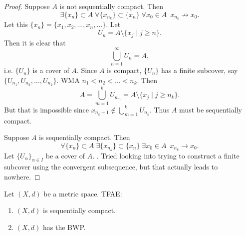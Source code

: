\documentclass[notoc,notitlepage]{tufte-book}
\begin{document}
\begin{proof}
  \hlbnoted{$(\implies)$} Suppose $A$ is not sequentially compact. Then
  \begin{equation*}
    \exists \{ x_n \} \subset A \; \forall \{ x_{n_k} \} \subset \{ x_n \} \; \forall x_0 \in A \enspace x_{n_k} \not\to x_0.
  \end{equation*}
  Let this $\{ x_n \} = \{ x_1, x_2, \ldots, x_n, \ldots \}$. Let
  \begin{equation*}
    U_n = A \setminus \{ x_j \mid j \geq n \}.
  \end{equation*}
  Then it is clear that
  \begin{equation*}
    \bigcup_{n=1}^{\infty} U_n = A,
  \end{equation*}
  i.e. $\{ U_n \}$ is a cover of $A$. Since $A$ is compact, $\{ U_n \}$ has a finite subcover, say $\{ U_{n_1}, U_{n_2}, \ldots, U_{n_k} \}$. WMA $n_1 < n_2 < \hdots < n_k$. Then
  \begin{equation*}
    A = \bigcup_{m=1}^{k} U_{n_m} = A \setminus \{ x_j \mid j \geq n_k \}.
  \end{equation*}
  But that is impossible since $x_{n_k + 1} \notin \bigcup_{m=1}^{k} U_{n_k}$. Thus $A$ must be sequentially compact.

  \noindent
  \hlbnoted{$(\impliedby)$} Suppose $A$ is sequentially compact. Then
  \begin{equation*}
    \forall \{ x_n \} \subset A \; \exists \{ x_{n_k} \} \subset \{ x_n \} \; \exists x_0 \in A \enspace x_{n_k} \to x_0.
  \end{equation*}
  Let $\{ U_\alpha \}_{\alpha \in I}$ be a cover of $A$. . Tried looking into trying to construct a finite subcover using the convergent subsequence, but that actually leads to nowhere. 
\end{proof}

\begin{thm}\label{thm:sequential_compactness_is_equivalent_to_bwp}
  Let $(X, d)$ be a metric space. TFAE:
  \begin{enumerate}
    \item $(X, d)$ is sequentially compact.
    \item $(X, d)$ has the BWP.
  \end{enumerate}
\end{thm}
\end{document}
